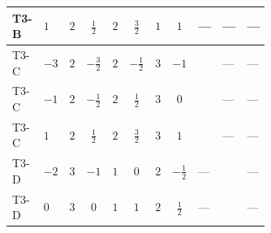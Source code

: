 \documentclass[8pt]{article}
\begin{document}
\begin{landscape}
\begin{longtable}{@{}llcccccc >{\raggedright\arraybackslash}p{0.21\linewidth} >{\raggedright\arraybackslash}p{0.21\linewidth} >{\raggedright\arraybackslash}p{0.21\linewidth}@{}}
\midrule
T3-B & $1$ & $2$ & $\frac{1}{2}$ & $2$ & $\frac{3}{2}$ & $1$ & $1$ & --- & --- & --- \\
\midrule
T3-C & $-3$ & $2$ & $-\frac{3}{2}$ & $2$ & $-\frac{1}{2}$ & $3$ & $-1$ & \scriptsize\adjustbox{max width=\linewidth}{$\begin{gathered} {\lambda_{HS_2}^{(1)}} (3 T_{\nu}^{(2)}+6 \operatorname{Tr}\!\left({Y_d}\,\left({Y_d}\right)^{\dagger}\right)+2 \operatorname{Tr}\!\left({Y_e}\,\left({Y_e}\right)^{\dagger}\right)+6 \operatorname{Tr}\!\left({Y_u}\,\left({Y_u}\right)^{\dagger}\right))\end{gathered}$} & --- & --- \\
\midrule
T3-C & $-1$ & $2$ & $-\frac{1}{2}$ & $2$ & $\frac{1}{2}$ & $3$ & $0$ & \scriptsize\adjustbox{max width=\linewidth}{$\begin{gathered} {\lambda_{HS_2}^{(1)}} (3 T_{\nu}^{(2)}+6 \operatorname{Tr}\!\left({Y_d}\,\left({Y_d}\right)^{\dagger}\right)+2 \operatorname{Tr}\!\left({Y_e}\,\left({Y_e}\right)^{\dagger}\right)+6 \operatorname{Tr}\!\left({Y_u}\,\left({Y_u}\right)^{\dagger}\right))\end{gathered}$} & --- & --- \\
\midrule
T3-C & $1$ & $2$ & $\frac{1}{2}$ & $2$ & $\frac{3}{2}$ & $3$ & $1$ & \scriptsize\adjustbox{max width=\linewidth}{$\begin{gathered} {\lambda_{HS_2}^{(1)}} (3 T_{\nu}^{(2)}+6 \operatorname{Tr}\!\left({Y_d}\,\left({Y_d}\right)^{\dagger}\right)+2 \operatorname{Tr}\!\left({Y_e}\,\left({Y_e}\right)^{\dagger}\right)+6 \operatorname{Tr}\!\left({Y_u}\,\left({Y_u}\right)^{\dagger}\right))\end{gathered}$} & --- & --- \\
\midrule
T3-D & $-2$ & $3$ & $-1$ & $1$ & $0$ & $2$ & $-\frac{1}{2}$ & --- & \scriptsize\adjustbox{max width=\linewidth}{$\begin{gathered} {\lambda_{HS_2}^{(1)}} (4 T_{\nu}^{(2)}+6 \operatorname{Tr}\!\left({Y_d}\,\left({Y_d}\right)^{\dagger}\right)+2 \operatorname{Tr}\!\left({Y_e}\,\left({Y_e}\right)^{\dagger}\right)+6 \operatorname{Tr}\!\left({Y_u}\,\left({Y_u}\right)^{\dagger}\right))\end{gathered}$} & --- \\
\midrule
T3-D & $0$ & $3$ & $0$ & $1$ & $1$ & $2$ & $\frac{1}{2}$ & --- & \scriptsize\adjustbox{max width=\linewidth}{$\begin{gathered} {\lambda_{HS_2}^{(1)}} (4 T_{\nu}^{(2)}+6 \operatorname{Tr}\!\left({Y_d}\,\left({Y_d}\right)^{\dagger}\right)+2 \operatorname{Tr}\!\left({Y_e}\,\left({Y_e}\right)^{\dagger}\right)+6 \operatorname{Tr}\!\left({Y_u}\,\left({Y_u}\right)^{\dagger}\right))\end{gathered}$} & --- \\

\end{longtable}
\end{landscape}
\end{document}
